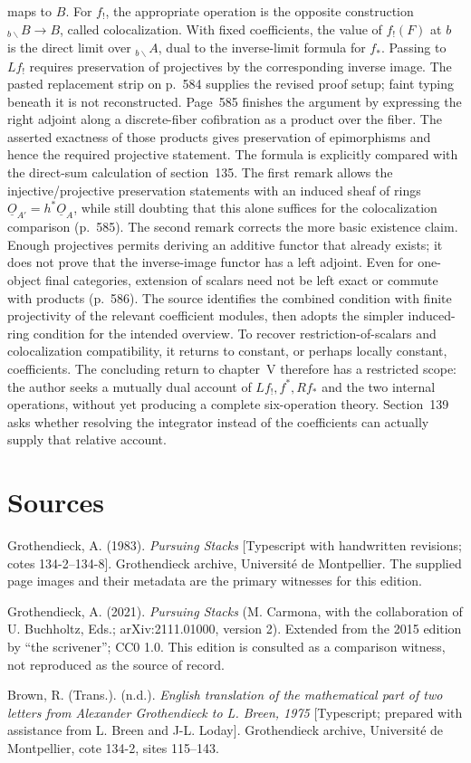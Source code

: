 \documentclass[10pt,oneside]{book}
\begin{document}
maps to $B$. For $f_!$, the appropriate operation is the opposite construction ${}_{b\backslash}B\to B$, called colocalization. With fixed coefficients, the value of $f_!(F)$ at $b$ is the direct limit over ${}_{b\backslash}A$, dual to the inverse-limit formula for $f_*$. Passing to $Lf_!$ requires preservation of projectives by the corresponding inverse image. The pasted replacement strip on p.~584 supplies the revised proof setup; faint typing beneath it is not reconstructed. Page~585 finishes the argument by expressing the right adjoint along a discrete-fiber cofibration as a product over the fiber. The asserted exactness of those products gives preservation of epimorphisms and hence the required projective statement. The formula is explicitly compared with the direct-sum calculation of section~135. The first remark allows the injective/projective preservation statements with an induced sheaf of rings $\underline O_{A'}=h^*\underline O_A$, while still doubting that this alone suffices for the colocalization comparison (p.~585). The second remark corrects the more basic existence claim. Enough projectives permits deriving an additive functor that already exists; it does not prove that the inverse-image functor has a left adjoint. Even for one-object final categories, extension of scalars need not be left exact or commute with products (p.~586). The source identifies the combined condition with finite projectivity of the relevant coefficient modules, then adopts the simpler induced-ring condition for the intended overview. To recover restriction-of-scalars and colocalization compatibility, it returns to constant, or perhaps locally constant, coefficients. The concluding return to chapter~V therefore has a restricted scope: the author seeks a mutually dual account of $Lf_!,f^*,Rf_*$ and the two internal operations, without yet producing a complete six-operation theory. Section~139 asks whether resolving the integrator instead of the coefficients can actually supply that relative account.


\chapter*{Sources}
Grothendieck, A. (1983). \emph{Pursuing Stacks} [Typescript with handwritten revisions; cotes 134-2--134-8]. Grothendieck archive, Université de Montpellier. The supplied page images and their metadata are the primary witnesses for this edition.

Grothendieck, A. (2021). \emph{Pursuing Stacks} (M. Carmona, with the collaboration of U. Buchholtz, Eds.; arXiv:2111.01000, version 2). Extended from the 2015 edition by ``the scrivener''; CC0 1.0. This edition is consulted as a comparison witness, not reproduced as the source of record.

Brown, R. (Trans.). (n.d.). \emph{English translation of the mathematical part of two letters from Alexander Grothendieck to L. Breen, 1975} [Typescript; prepared with assistance from L. Breen and J-L. Loday]. Grothendieck archive, Université de Montpellier, cote 134-2, sites 115--143.
\end{document}
